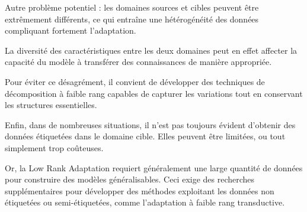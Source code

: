 Autre problème potentiel : les domaines sources et cibles peuvent être extrêmement
différents, ce qui entraîne une hétérogénéité des données compliquant fortement
l’adaptation.

La diversité des caractéristiques entre les deux domaines peut en effet affecter
la capacité du modèle à transférer des connaissances de manière appropriée.

Pour éviter ce désagrément, il convient de développer des techniques de décomposition
à faible rang capables de capturer les variations tout en conservant les structures
essentielles.

Enfin, dans de nombreuses situations, il n’est pas toujours évident d’obtenir des
données étiquetées dans le domaine cible. Elles peuvent être limitées, ou tout simplement
trop coûteuses.

Or, la Low Rank Adaptation requiert généralement une large quantité de données
pour construire des modèles généralisables. Ceci exige des recherches supplémentaires
pour développer des méthodes exploitant les données non étiquetées ou semi-étiquetées,
comme l’adaptation à faible rang transductive.
\newpage
{}
